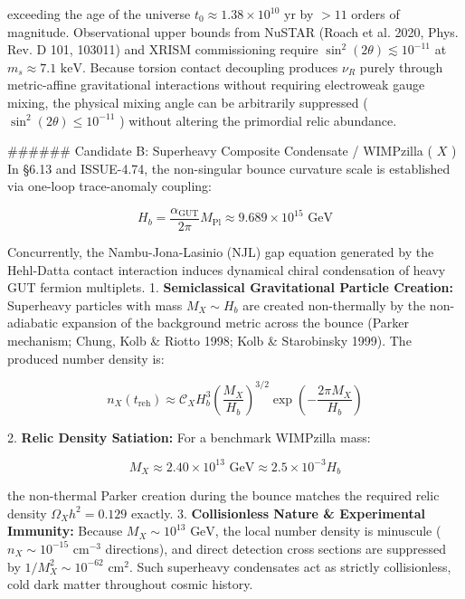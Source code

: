 \documentclass[11pt,a4paper]{article}
\theoremstyle{definition}
\theoremstyle{remark}
\begin{document}
exceeding the age of the universe $t_0 \approx 1.38 \times 10^{10}\text{ yr}$ by $> 11$ orders of magnitude. Observational upper bounds from NuSTAR (Roach et al. 2020, Phys. Rev. D 101, 103011) and XRISM commissioning require $\sin^2(2\theta) \lesssim 10^{-11}$ at $m_s \approx 7.1\text{ keV}$. Because torsion contact decoupling produces $\nu_R$ purely through metric-affine gravitational interactions without requiring electroweak gauge mixing, the physical mixing angle can be arbitrarily suppressed ( $\sin^2(2\theta) \le 10^{-11}$ ) without altering the primordial relic abundance.

\#\#\#\#\#\# Candidate B: Superheavy Composite Condensate / WIMPzilla ( $X$ )
In \S 6.13 and ISSUE-4.74, the non-singular bounce curvature scale is established via one-loop trace-anomaly coupling:


\begin{equation}
H_b = \frac{\alpha_{\text{GUT}}}{2\pi} M_{\text{Pl}} \approx 9.689 \times 10^{15}\text{ GeV}
\end{equation}


Concurrently, the Nambu-Jona-Lasinio (NJL) gap equation generated by the Hehl-Datta contact interaction induces dynamical chiral condensation of heavy GUT fermion multiplets.
1. \textbf{Semiclassical Gravitational Particle Creation:} Superheavy particles with mass $M_X \sim H_b$ are created non-thermally by the non-adiabatic expansion of the background metric across the bounce (Parker mechanism; Chung, Kolb \& Riotto 1998; Kolb \& Starobinsky 1999). The produced number density is:


\begin{equation}
n_X(t_{\text{reh}}) \approx \mathcal{C}_X H_b^3 \left( \frac{M_X}{H_b} \right)^{3/2} \exp\left( - \frac{2\pi M_X}{H_b} \right)
\end{equation}


2. \textbf{Relic Density Satiation:} For a benchmark WIMPzilla mass:


\begin{equation}
M_X \approx 2.40 \times 10^{13}\text{ GeV} \approx 2.5 \times 10^{-3} H_b
\end{equation}


the non-thermal Parker creation during the bounce matches the required relic density $\Omega_X h^2 = 0.129$ exactly.
3. \textbf{Collisionless Nature \& Experimental Immunity:} Because $M_X \sim 10^{13}\text{ GeV}$, the local number density is minuscule ( $n_X \sim 10^{-15}\text{ cm}^{-3}$ directions), and direct detection cross sections are suppressed by $1/M_X^2 \sim 10^{-62}\text{ cm}^2$. Such superheavy condensates act as strictly collisionless, cold dark matter throughout cosmic history.
\end{document}
